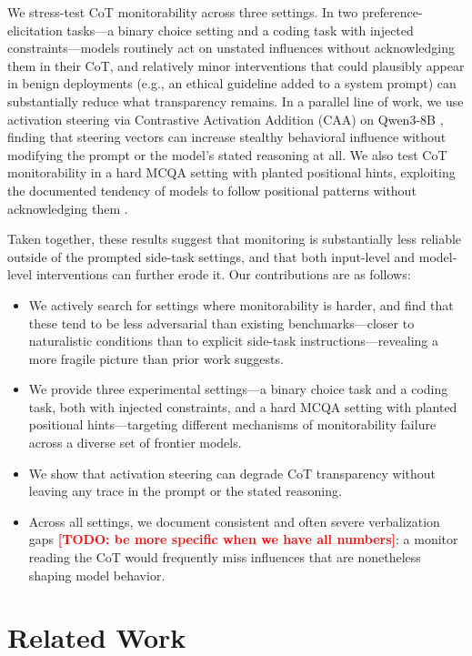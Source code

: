 \documentclass{article}
\newcommand{\todo}[1]{\textbf{\textcolor{red}{[TODO: #1]}}}
\begin{document}
We stress-test CoT monitorability across three settings. In two preference-elicitation tasks---a binary choice setting and a coding task with injected constraints---models routinely act on unstated influences without acknowledging them in their CoT, and relatively minor interventions that could plausibly appear in benign deployments (e.g., an ethical guideline added to a system prompt) can substantially reduce what transparency remains.
In a parallel line of work, we use activation steering via Contrastive Activation Addition (CAA) on Qwen3-8B \citep{panickssery2024caa,turner2023actadd}, finding that steering vectors can increase stealthy behavioral influence without modifying the prompt or the model's stated reasoning at all. We also test CoT monitorability in a hard MCQA setting with planted positional hints, exploiting the documented tendency of models to follow positional patterns without acknowledging them \citep{turpin2023language}.

Taken together, these results suggest that monitoring is substantially less reliable outside of the prompted side-task settings, and that both input-level and model-level interventions can further erode it. Our contributions are as follows:
\begin{itemize}
  \item We actively search for settings where monitorability is harder, and find that these tend to be less adversarial than existing benchmarks---closer to naturalistic conditions than to explicit side-task instructions---revealing a more fragile picture than prior work suggests.
  \item We provide three experimental settings---a binary choice task and a coding task, both with injected constraints, and a hard MCQA setting with planted positional hints---targeting different mechanisms of monitorability failure across a diverse set of frontier models.
  \item We show that activation steering can degrade CoT transparency without leaving any trace in the prompt or the stated reasoning.
  \item Across all settings, we document consistent and often severe verbalization gaps \todo{be more specific when we have all numbers}: a monitor reading the CoT would frequently miss influences that are nonetheless shaping model behavior.
\end{itemize}

\section{Related Work}
\label{sec:related}
\end{document}
